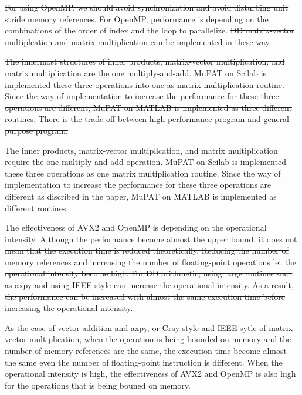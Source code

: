 \documentclass{IOS-Book-Article}
\begin{document}
\sout{For using OpenMP, we should avoid synchronization and avoid disturbing unit stride memory references.}
For OpenMP, performance is depending on the combinations of the order of index and the loop to parallelize.
\sout{DD matrix-vector multiplcation and matrix multiplication can be implemented in these way. }


\sout{The innermost structures of inner products, matrix-vector multiplication, and matrix multiplication are the one multiply-and-add. MuPAT on Scilab is implemented these three operations into one as matrix multiplication routine. Since the way of implementation to increase the performance for these three operations are different, MuPAT on MATLAB is implemented as three different routines. There is the trade-off between high performance program and general purpose program.}

The inner products, matrix-vector multiplication, and matrix multiplication require the one multiply-and-add operation.
MuPAT on Scilab is implemented these three operations as one matrix multiplication routine. 
Since the way of implementation to increase the performance for these three operations are different as discribed in the paper, 
MuPAT on MATLAB is implemented as different routines. 

The effectiveness of AVX2 and OpenMP is depending on the operational intensity. 
\sout{Although the performance become almost the upper bound, it does not mean that the execution time is reduced theoretically. Reducing the number of memory references and increasing the number of floating-point operations let the operational intensity become high. For DD arithmetic, using large routines such as axpy and using IEEE-style can increase the operational intensity. As a result, the performance can be increased with almost the same execution time before increasing the operational intensity. }

As the case of vector addition and axpy, or Cray-style and IEEE-sytle of matrix-vector multiplication, when the operation is being bounded on memory and the number of memory references are the same, 
the execution time become almost the same even the number of floating-point instruction is different. 
When the operational intensity is high, the effectiveness of AVX2 and OpenMP is also high for the operations that is being bouned on memory.
\end{document}
